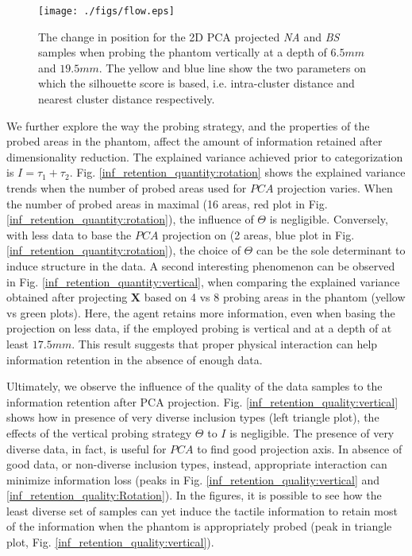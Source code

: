 \begin{figure}[]
	\centering
	\texttt{[image: ./figs/flow.eps]}
	\caption{The change in position for the 2D PCA projected \textit{NA} and \textit{BS} samples 
		when probing the phantom vertically at a depth of $6.5mm$ and $19.5mm$. The yellow and blue line 
		show the two parameters on which the silhouette score is based, i.e. intra-cluster distance and 
		nearest cluster distance respectively.}
	\label{flow}
\end{figure}
We further explore the way the probing strategy, and the properties of the probed areas in the  phantom,
affect the amount of information retained after dimensionality reduction. The explained variance achieved
prior to categorization is $I = \tau_1+\tau_2$. Fig. \ref{inf_retention_quantity:rotation} 
shows the explained variance trends when the number of probed areas used for $PCA$ projection varies. 
When the number of probed areas in maximal (16 areas, red plot in Fig. \ref{inf_retention_quantity:rotation}), 
the influence of $\Theta$ is negligible. Conversely, with less data to base the $PCA$ projection on (2 areas, 
blue plot in Fig. \ref{inf_retention_quantity:rotation}), the choice of $\Theta$ can be the sole determinant to
induce structure in the data. 
A second interesting phenomenon can be observed in Fig. \ref{inf_retention_quantity:vertical},  
when comparing the explained variance obtained after projecting $\mathbf{X}$ based on 4 vs 8 probing areas in
the phantom (yellow vs green plots). Here, the agent retains more information, even when basing the projection 
on less data, if the employed probing is vertical and at a depth of at least $17.5mm$. This result suggests that 
proper physical interaction can help information retention in the absence of enough data.


Ultimately, we observe the influence of the quality of the data samples to the information retention after 
PCA projection. Fig. \ref{inf_retention_quality:vertical} shows how in presence of very diverse inclusion types 
(left triangle plot), the effects of the vertical probing strategy $\Theta$ to $I$ is negligible. The presence of 
very diverse data, in fact, is useful for $PCA$ to find good projection axis. 
In absence of good data, or non-diverse inclusion types, instead, appropriate interaction can minimize 
information loss (peaks in Fig. \ref{inf_retention_quality:vertical} and \ref{inf_retention_quality:Rotation}).
In the figures, it is possible to see how the least diverse set of samples can yet induce 
the tactile information to retain most of the information when  the phantom is appropriately probed 
(peak in triangle plot, Fig. \ref{inf_retention_quality:vertical}).


